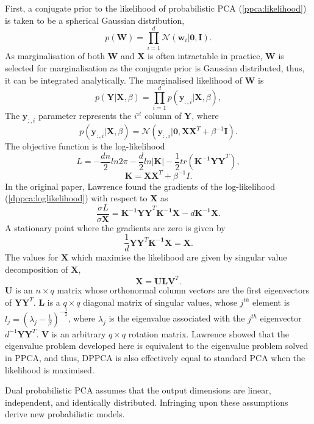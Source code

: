 \documentclass[ %
author={Dillon Keith Diep},
supervisor={Dr. Carl Henrik Ek},
degree={MEng},
title={ART-CG:},
subtitle={Assisted Real-time Content Generation of 3D Hair by Learning Manifolds},
type={Research},
year={2017} ]{dissertation}
\begin{document}
First, a conjugate prior to the likelihood of probabilistic PCA (\ref{ppca:likelihood}) is taken to be a spherical Gaussian distribution,
$$p(\bm{W})=\prod^d_{i=1}\mathcal{N}(\bm{w}_i|\bm{0,I}).$$
As marginalisation of both $\bm{W}$ and $\bm{X}$ is often intractable in practice, $\bm{W}$ is selected for marginalisation as the conjugate prior is Gaussian distributed, thus, it can be integrated analytically.
The marginalised likelihood of $\bm{W}$ is
$$p(\bm{Y|X},\beta)=\prod^d_{i=1}p(\bm{y}_{:,i}|\bm{X},\beta),$$
The $\bm{y}_{:,i}$ parameter represents the $i^{it}$ column of $\bm{Y}$, where
$$p(\bm{y}_{:,i}|\bm{X},\beta)=\mathcal{N}(\bm{y}_{:,i}|\bm{0,XX}^T+\beta^{-1}\bm{I}).$$
The objective function is the log-likelihood
\begin{equation} \label{dppca:loglikelihood}
L=-\frac{dn}{2}ln2\pi-\frac{d}{2}ln|\bm{K}|-\frac{1}{2}tr(\bm{K^{-1}YY}^T),
\end{equation}
$$\bm{K=XX}^T+\beta^{-1}I.$$
In the original paper, Lawrence found the gradients of the log-likelihood (\ref{dppca:loglikelihood}) with respect to $\bm{X}$ as
$$\frac{\sigma L}{\sigma \bm{X}}=\bm{K^{-1}YY}^T\bm{K^{-1}X}-d\bm{K^{-1}X}.$$ 
A stationary point where the gradients are zero is given by
$$\frac{1}{d}\bm{YY}^T\bm{K^{-1}X=X}.$$
The values for $\bm{X}$ which maximise the likelihood are given by singular value decomposition of $\bm{X}$,
$$\bm{X=ULV}^T.$$
$\bm{U}$ is an $n \times q$ matrix whose orthonormal column vectors are the first eigenvectors of $\bm{YY}^T$. $\bm{L}$ is a $q \times q$ diagonal matrix of singular values, whose $j^{th}$ element is $l_j=(\lambda_j-\frac{1}{\beta})^{-\frac{1}{2}}$, where $\lambda_j$ is the eigenvalue associated with the $j^{th}$ eigenvector $d^{-1}\bm{YY}^T$. $\bm{V}$ is an arbitrary $q\times q$ rotation matrix. Lawrence showed that the eigenvalue problem developed here is equivalent to the eigenvalue problem solved in PPCA, and thus, DPPCA is also effectively equal to standard PCA when the likelihood is maximised.

Dual probabilistic PCA assumes that the output dimensions are linear, independent, and identically distributed. Infringing upon these assumptions derive new probabilistic models.
\end{document}
